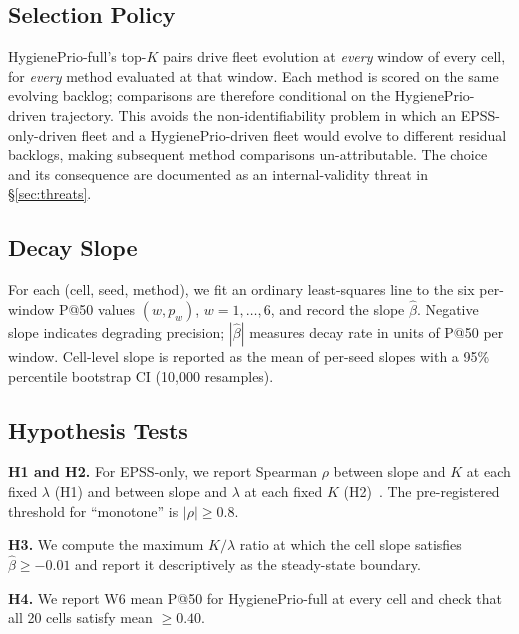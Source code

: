 \subsection{Selection Policy}

HygienePrio-full's top-$K$ pairs drive fleet evolution at \textit{every}
window of every cell, for \textit{every} method evaluated at that window.
Each method is scored on the same evolving backlog; comparisons are
therefore conditional on the HygienePrio-driven trajectory. This avoids
the non-identifiability problem in which an EPSS-only-driven fleet and
a HygienePrio-driven fleet would evolve to different residual backlogs,
making subsequent method comparisons un-attributable. The choice and its
consequence are documented as an internal-validity threat in
\S\ref{sec:threats}.

\subsection{Decay Slope}

For each (cell, seed, method), we fit an ordinary least-squares line to
the six per-window P@50 values $(w, p_w)$, $w = 1, \ldots, 6$, and
record the slope $\hat\beta$. Negative slope indicates degrading
precision; $|\hat\beta|$ measures decay rate in units of P@50 per
window. Cell-level slope is reported as the mean of per-seed slopes with
a 95\% percentile bootstrap CI (10{,}000 resamples).

\subsection{Hypothesis Tests}

\textbf{H1 and H2.} For EPSS-only, we report Spearman $\rho$ between
slope and $K$ at each fixed $\lambda$ (H1) and between slope and
$\lambda$ at each fixed $K$ (H2)~\cite{spearman1904}. The pre-registered
threshold for ``monotone'' is $|\rho| \geq 0.8$.

\textbf{H3.} We compute the maximum $K/\lambda$ ratio at which the cell
slope satisfies $\hat\beta \geq -0.01$ and report it descriptively as
the steady-state boundary.

\textbf{H4.} We report W6 mean P@50 for HygienePrio-full at every cell
and check that all 20 cells satisfy mean $\geq 0.40$.
